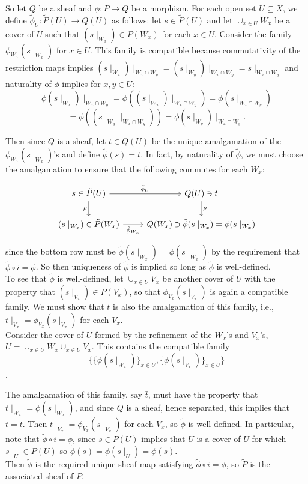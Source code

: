 So let $Q$ be a sheaf and $\phi:P \rightarrow Q$ be a morphism. For each open set $U \subseteq X$, we define $\tilde{\phi}_U: \tilde{P}(U) \rightarrow Q(U)$ as follows: let $s \in \tilde{P}(U)$ and let $\cup_{x \in U} W_x$ be a cover of $U$ such that $(s\mid_{W_x}) \in P(W_x)$ for each $x \in U$. Consider the family $\phi_{W_x}(s\mid_{W_x})$ for $x \in U$. This family is compatible because commutativity of the restriction maps implies $(s\mid_{W_x})\mid_{W_x\cap W_y}=(s\mid_{W_y})\mid_{W_x\cap W_y}=s\mid_{W_x\cap W_y}$ and naturality of $\phi$ implies for $x,y \in U$:
 \[\phi(s\mid_{W_x})\mid_{W_x\cap W_y}=\phi((s\mid_{W_x})\mid_{W_x\cap W_y})=\phi(s\mid_{W_x\cap W_y})\]
 \[=\phi((s\mid_{W_y}\mid_{W_x\cap W_y}))=\phi(s\mid_{W_y})\mid_{W_x\cap W_y}.\]

Then since $Q$ is a sheaf, let $t \in Q(U)$ be the unique amalgamation of the $\phi_{W_x}(s\mid_{W_x})$'s and define $\tilde{\phi}(s)=t$. In fact, by naturality of $\tilde{\phi}$, we must choose the amalgamation to ensure that the following commutes for each $W_x$:  

\[
\begin{tikzcd}
s \in \tilde{P}(U) \arrow[r, "\tilde{\phi}_U"] \arrow[d, "\rho"']
& Q(U) \ni t \arrow[d, "\rho"] \\
(s\mid_{W_x})\in \tilde{P}(W_x) \arrow[r, "\tilde{\phi}_{W_x}"']
& Q(W_x) \ni \tilde{\phi}(s\mid_{W_x}) = \phi(s\mid_{W_x})
\end{tikzcd}
\]

since the bottom row must be $\tilde{\phi}(s\mid_{W_x})=\phi(s\mid_{W_x})$ by the requirement that $\tilde{\phi} \circ i = \phi$. So then uniqueness of $\tilde{\phi}$ is implied so long as $\tilde{\phi}$ is well-defined.\\

To see that $\tilde{\phi}$ is well-defined, let $\cup_{x \in U} V_x$ be another cover of $U$ with the property that $(s\mid_{V_x}) \in P(V_x)$, so that $ \phi_{V_x}(s\mid_{V_x})$ is again a compatible family. We must show that $t$ is also the amalgamation of this family, i.e., $t\mid_{V_x} = \phi_{V_x}(s\mid_{V_x})$ for each $V_x$.\\

Consider the cover of $U$ formed by the refinement of the $W_x$'s and $V_x$'s, $U = \cup_{x \in U} W_x \cup_{x \in U} V_x$. This contains the compatible family \[\{\{\phi(s\mid_{W_x})\}_{x\in U},\{\phi(s\mid_{V_x})\}_{x\in U}\}\].

The amalgamation of this family, say $\bar{t}$, must have the property that $\bar{t}\mid_{W_x}=\phi(s\mid_{W_x})$, and since $Q$ is a sheaf, hence separated, this implies that $\bar{t}=t$. Then $t\mid_{V_x} = \phi_{V_x}(s\mid_{V_x})$ for each $V_x$, so $\tilde{\phi}$ is well-defined. In particular, note that $\tilde{\phi} \circ i = \phi$, since $s \in P(U)$ implies that $U$ is a cover of $U$ for which $s \mid_U \in P(U)$ so $\tilde{\phi}(s)=\phi(s\mid_U)=\phi(s)$.\\

Then $\tilde{\phi}$ is the required unique sheaf map satisfying $\tilde{\phi} \circ i = \phi$, so $\tilde{P}$ is the associated sheaf of $P$. 

